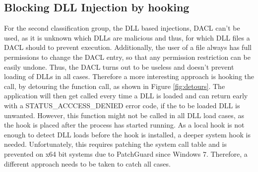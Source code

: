 \subsection{Blocking DLL Injection by hooking }
For the second classification group, the DLL based injections, DACL can't be used, as it is unknown which DLLs are malicious and thus, for which DLL files a DACL should to prevent execution. Additionally, the user of a file always has full permissions to change the DACL entry, so that any permission restriction can be easily undone. Thus, the DACL turns out to be useless and doesn't prevent loading of DLLs in all cases. Therefore a more interesting approach is hooking the  call, by detouring the function call, as shown in Figure \ref{fig:detours}. The application will then get called every time a DLL is loaded and can return early with a STATUS\_ACCCESS\_DENIED error code, if the to be loaded DLL is unwanted. However, this function might not be called in all DLL load cases, as the hook is placed after the process has started running. As a local hook is not enough to detect DLL loads before the hook is installed, a deeper system hook is needed. Unfortunately, this requires patching the system call table and is prevented on x64 bit systems due to PatchGuard since Windows 7. Therefore, a different approach needs to be taken to catch all cases.

